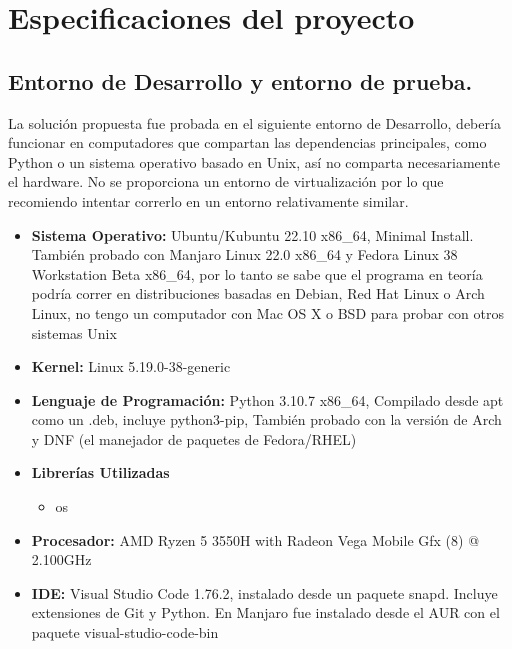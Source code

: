 \documentclass[a4paper]{article}
\begin{document}
\section{Especificaciones del proyecto}

\subsection{Entorno de Desarrollo y entorno de prueba.}

La solución propuesta fue probada en el siguiente entorno de Desarrollo, debería funcionar en
computadores que compartan las dependencias principales, como Python o un sistema operativo basado
en Unix, así no comparta necesariamente el hardware. No se proporciona un entorno de virtualización
por lo que recomiendo intentar correrlo en un entorno relativamente similar.

\begin{itemize}
    \item \textbf{Sistema Operativo: } Ubuntu/Kubuntu 22.10 x86\_64, Minimal Install. También probado con Manjaro Linux 22.0 x86\_64 y Fedora
    Linux 38 Workstation Beta x86\_64, por lo tanto se sabe que el programa en teoría podría correr en distribuciones basadas en Debian,
    Red Hat Linux o Arch Linux, no tengo un computador con Mac OS X o BSD para probar con otros sistemas Unix
    \item \textbf{Kernel: }Linux 5.19.0-38-generic
    \item \textbf{Lenguaje de Programación: }Python 3.10.7 x86\_64, Compilado desde apt como un .deb, incluye python3-pip,
    También probado con la versión de Arch y DNF (el manejador de paquetes de Fedora/RHEL)
    \item \textbf{Librerías Utilizadas}
    \begin{itemize}
        \item os
    \end{itemize}
    \item \textbf{Procesador: }AMD Ryzen 5 3550H with Radeon Vega Mobile Gfx (8) @ 2.100GHz 
    \item \textbf{IDE: } Visual Studio Code 1.76.2, instalado desde un paquete snapd. Incluye extensiones
    de Git y Python. En Manjaro fue instalado desde el AUR con el paquete visual-studio-code-bin
\end{itemize}
\end{document}

